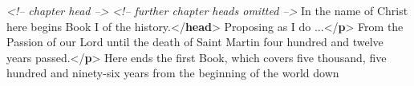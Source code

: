 \begin{shaded}
\hspace*{1em}\mbox{}\newline 
\hspace*{1em}\hspace*{1em}\mbox{}\newline 
\textit{<!-- chapter head -->}\mbox{}\newline 
\hspace*{1em}\hspace*{1em}\mbox{}\newline 
\textit{<!-- further chapter heads omitted -->}\mbox{}\newline 
\hspace*{1em}\mbox{}\newline 
{}\mbox{}\newline 
{}\mbox{}\newline 
\hspace*{1em}In the name of Christ here begins Book I of the history.{</\textbf{head}>}\mbox{}\newline 
\hspace*{1em}Proposing as I do ...{</\textbf{p}>}\mbox{}\newline 
\hspace*{1em}From the Passion of our Lord until the death of Saint Martin four\mbox{}\newline 
\hspace*{1em}\hspace*{1em}\hspace*{1em}\hspace*{1em} hundred and twelve years passed.{</\textbf{p}>}\mbox{}\newline 
\hspace*{1em}Here ends the first Book, which covers five thousand, five\mbox{}\newline 
\hspace*{1em}\hspace*{1em}\hspace*{1em}\hspace*{1em} hundred and ninety-six years from the beginning of the world down\mbox{}\newline 

\end{shaded}
